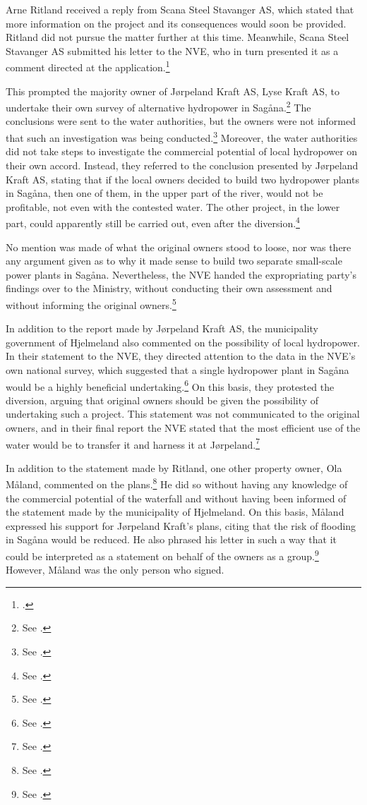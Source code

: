 Arne Ritland received a reply from Scana Steel Stavanger AS, which stated that more information on the project and its consequences would soon be provided. Ritland did not pursue the matter further at this time. Meanwhile, Scana Steel Stavanger AS submitted his letter to the NVE, who in turn presented it as a comment directed at the application.\footnote{\cite[18]{jorpeland09}.}

This prompted the majority owner of Jørpeland Kraft AS, Lyse Kraft AS, to undertake their own survey of alternative hydropower in Sagåna.\footnote{See \cite[19]{jorpeland09}.} The conclusions were sent to the water authorities, but the owners were not informed that such an investigation was being conducted.\footnote{See \cite[23]{jorpeland09}.} Moreover, the water authorities did not take steps to investigate the commercial potential of local hydropower on their own accord. Instead, they referred to the conclusion presented by Jørpeland Kraft AS, stating that if the local owners decided to build two hydropower plants in Sagåna, then one of them, in the upper part of the river, would not be profitable, not even with the contested water. The other project, in the lower part, could apparently still be carried out, even after the diversion.\footnote{See \cite[23]{jorpeland09}.}

No mention was made of what the original owners stood to loose, nor was there any argument given as to why it made sense to build two separate small-scale power plants in Sagåna. Nevertheless, the NVE handed the expropriating party's findings over to the Ministry, without conducting their own assessment and without informing the original owners.\footnote{See \cite[22-23]{jorpeland09}.}

In addition to the report made by Jørpeland Kraft AS, the municipality government of Hjelmeland also commented on the possibility of local hydropower. In their statement to the NVE, they directed attention to the data in the NVE's own national survey, which suggested that a single hydropower plant in Sagåna would be a highly beneficial undertaking.\footnote{See \cite[19]{jorpeland09}.} On this basis, they protested the diversion, arguing that original owners should be given the possibility of undertaking such a project. This statement was not communicated to the original owners, and in their final report the NVE stated that the most efficient use of the water would be to transfer it and harness it at Jørpeland.\footnote{See \cite[19]{jorpeland09}.}

In addition to the statement made by Ritland, one other property owner, Ola Måland, commented on the plans.\footnote{See \cite[17]{jorpeland09}.} He did so without having any knowledge of the commercial potential of the waterfall and without having been informed of the statement made by the municipality of Hjelmeland. On this basis, Måland expressed his support for Jørpeland Kraft's plans, citing that the risk of flooding in Sagåna would be reduced. He also phrased his letter in such a way that it could be interpreted as a statement on behalf of the owners as a group.\footnote{See \cite[17]{jorpeland09}.} However, Måland was the only person who signed.

